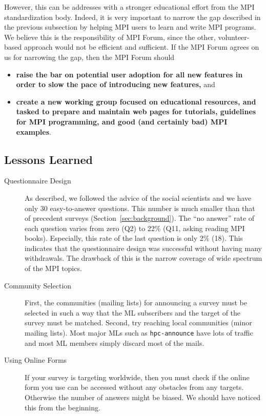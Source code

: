 \documentclass[preprint,5p,times]{elsarticle}
\newcommand{\revision}[2]{{\color{blue}#2}}
\begin{document}
{However, this can be  addresses with a stronger educational effort from the MPI
standardization body. Indeed, it is very important to narrow the gap described in
the previous subsection by helping MPI users to learn and write MPI programs. We
believe this is the responsibility of MPI Forum, since the other,
volunteer-based approach would not be efficient and sufficient. If
\revision{}{the} MPI Forum
agrees \revision{with}{on} us for narrowing the gap, then \revision{}{the} MPI Forum should
%
\begin{itemize}
\item {\bf raise the bar on potential user adoption for all new features in
order to slow the pace of introducing new features,} and
%
\item {\bf create a new working group focused on educational resources, and
tasked to prepare and maintain web pages for tutorials, guidelines for MPI
programming, and good (and certainly bad) MPI examples}.
\end{itemize}

\revision{}{
\subsection{Lessons Learned}

\begin{description}

\item[Questionnaire Design]
As described, we followed the advice of the social scientists and we have
only 30 easy-to-answer questions. This number is much smaller than
that of precedent 
surveys (Section~\ref{sec:background}). The ``no answer'' rate of each
question varies from zero (Q2) to 22\% (Q11, asking reading MPI
books). Especially, this rate of the  
last question is only 2\% (18). This indicates that the questionnaire
design was successful without having many withdrawals. The drawback of
this is the narrow coverage of wide spectrum of the MPI topics. 

\item[Community Selection]
First, the communities (mailing lists) for announcing a survey must be selected
in such a way that the ML subscribers and the target of the survey
must be matched. Second, try reaching local communities (minor mailing
lists). Most major MLs such as {\tt hpc-announce} have lots 
of traffic and most ML members simply discard most of the mails.

\item[Using Online Forms]
If your survey is targeting worldwide, then you must check if the
online form you use can be accessed without any obstacles from any 
targets. Otherwise the number of answers might be biased. We should
have noticed this from the beginning.


\end{description}}}
\end{document}
